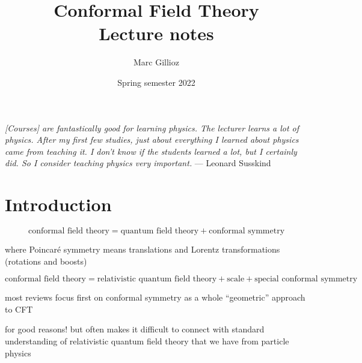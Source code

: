 \documentclass[a4paper,12pt]{article}
\title{%
Conformal Field Theory
\\[1em]
\Large
Lecture notes}
\author{Marc Gillioz}
\date{Spring semester 2022}
\numberwithin{equation}{section}
\begin{document}
 

\maketitle

\begin{center}
	\parbox{11.8cm}{\emph{%
[Courses] are fantastically good for learning physics. The lecturer learns a lot of physics. After my first few studies, just about everything I learned about physics came from teaching it. I don’t know if the students learned a lot, but I certainly did. So I consider teaching physics very important.} --- Leonard Susskind}
\end{center}


\newpage

\tableofcontents


\newpage
\section{Introduction}

\begin{equation}
	\text{conformal field theory}
	= \text{quantum field theory} + \text{conformal symmetry}
\end{equation}


where Poincaré symmetry means translations and Lorentz transformations (rotations and boosts)

\begin{equation}
	\text{conformal field theory}
	= \text{relativistic quantum field theory} 
	+ \text{scale}
	+ \text{special conformal symmetry}
\end{equation}

most reviews focus first on conformal symmetry as a whole 
``geometric'' approach to CFT

for good reasons!
but often makes it difficult to connect with standard understanding of relativistic quantum field theory that we have from particle physics
\end{document}
